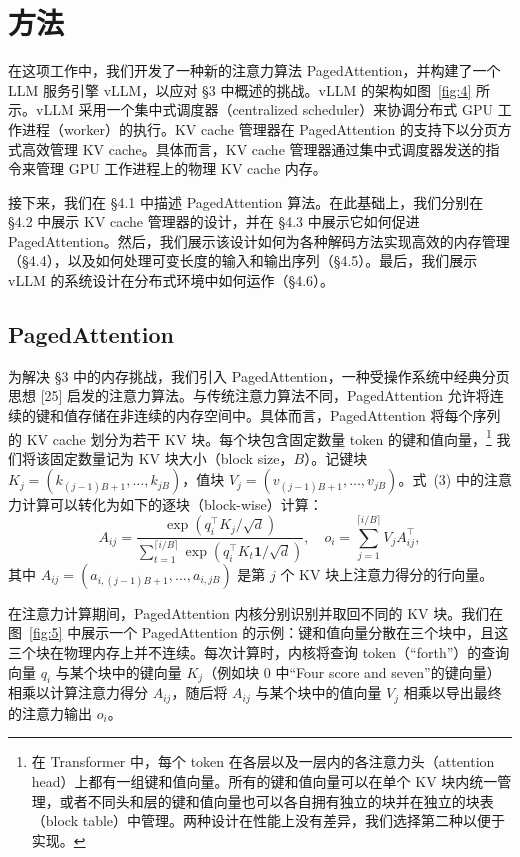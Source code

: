 \documentclass[11pt,UTF8,fontset=fandol]{ctexart}
\begin{document}
\section{方法}

在这项工作中，我们开发了一种新的注意力算法 PagedAttention，并构建了一个 LLM 服务引擎 vLLM，以应对 \S3 中概述的挑战。vLLM 的架构如图~\ref{fig:4} 所示。vLLM 采用一个集中式调度器（centralized scheduler）来协调分布式 GPU 工作进程（worker）的执行。KV cache 管理器在 PagedAttention 的支持下以分页方式高效管理 KV cache。具体而言，KV cache 管理器通过集中式调度器发送的指令来管理 GPU 工作进程上的物理 KV cache 内存。

接下来，我们在 \S4.1 中描述 PagedAttention 算法。在此基础上，我们分别在 \S4.2 中展示 KV cache 管理器的设计，并在 \S4.3 中展示它如何促进 PagedAttention。然后，我们展示该设计如何为各种解码方法实现高效的内存管理（\S4.4），以及如何处理可变长度的输入和输出序列（\S4.5）。最后，我们展示 vLLM 的系统设计在分布式环境中如何运作（\S4.6）。

\subsection{PagedAttention}

为解决 \S3 中的内存挑战，我们引入 PagedAttention，一种受操作系统中经典分页思想 [25] 启发的注意力算法。与传统注意力算法不同，PagedAttention 允许将连续的键和值存储在非连续的内存空间中。具体而言，PagedAttention 将每个序列的 KV cache 划分为若干 KV 块。每个块包含固定数量 token 的键和值向量，\footnote{在 Transformer 中，每个 token 在各层以及一层内的各注意力头（attention head）上都有一组键和值向量。所有的键和值向量可以在单个 KV 块内统一管理，或者不同头和层的键和值向量也可以各自拥有独立的块并在独立的块表（block table）中管理。两种设计在性能上没有差异，我们选择第二种以便于实现。} 我们将该固定数量记为 KV 块大小（block size，$B$）。记键块 $K_j = (k_{(j-1)B+1}, \ldots, k_{jB})$，值块 $V_j = (v_{(j-1)B+1}, \ldots, v_{jB})$。式~(3) 中的注意力计算可以转化为如下的逐块（block-wise）计算：
\begin{equation}
A_{ij} = \frac{\exp(q_i^\top K_j / \sqrt{d})}{\sum_{t=1}^{\lceil i/B \rceil} \exp(q_i^\top K_t \mathbf{1} / \sqrt{d})}, \quad o_i = \sum_{j=1}^{\lceil i/B \rceil} V_j A_{ij}^\top, \tag{4}
\end{equation}
其中 $A_{ij} = (a_{i,(j-1)B+1}, \ldots, a_{i,jB})$ 是第 $j$ 个 KV 块上注意力得分的行向量。

在注意力计算期间，PagedAttention 内核分别识别并取回不同的 KV 块。我们在图~\ref{fig:5} 中展示一个 PagedAttention 的示例：键和值向量分散在三个块中，且这三个块在物理内存上并不连续。每次计算时，内核将查询 token（``forth''）的查询向量 $q_i$ 与某个块中的键向量 $K_j$（例如块 0 中``Four score and seven''的键向量）相乘以计算注意力得分 $A_{ij}$，随后将 $A_{ij}$ 与某个块中的值向量 $V_j$ 相乘以导出最终的注意力输出 $o_i$。
\end{document}
